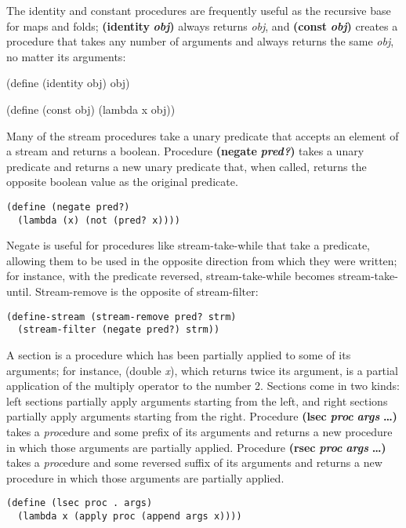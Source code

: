 The identity and constant procedures are frequently useful as the
recursive base for maps and folds; \textbf{(identity}
\textbf{\emph{obj})} always returns \emph{obj}, and \textbf{(const}
\textbf{\emph{obj})} creates a procedure that takes any number of
arguments and always returns the same \emph{obj}, no matter its
arguments:

(define (identity obj) obj)

(define (const obj) (lambda x obj))

Many of the stream procedures take a unary predicate that accepts an
element of a stream and returns a boolean. Procedure \textbf{(negate}
\textbf{\emph{pred?})} takes a unary predicate and returns a new unary
predicate that, when called, returns the opposite boolean value as the
original predicate.

\begin{verbatim}
(define (negate pred?)
  (lambda (x) (not (pred? x))))
\end{verbatim}

Negate is useful for procedures like stream-take-while that take a
predicate, allowing them to be used in the opposite direction from which
they were written; for instance, with the predicate reversed,
stream-take-while becomes stream-take-until. Stream-remove is the
opposite of stream-filter:

\begin{verbatim}
(define-stream (stream-remove pred? strm)
  (stream-filter (negate pred?) strm))
\end{verbatim}

A section is a procedure which has been partially applied to some of its
arguments; for instance, (double \emph{x}), which returns twice its
argument, is a partial application of the multiply operator to the
number 2. Sections come in two kinds: left sections partially apply
arguments starting from the left, and right sections partially apply
arguments starting from the right. Procedure \textbf{(lsec}
\textbf{\emph{proc}} \textbf{} \textbf{\emph{args}} \textbf{\ldots{})}
takes a \emph{proc}edure and some prefix of its arguments and returns a
new procedure in which those arguments are partially applied. Procedure
\textbf{(rsec} \textbf{\emph{proc}} \textbf{} \textbf{\emph{args}}
\textbf{\ldots{})} takes a \emph{proc}edure and some reversed suffix of
its arguments and returns a new procedure in which those arguments are
partially applied.

\begin{verbatim}
(define (lsec proc . args)
  (lambda x (apply proc (append args x))))
\end{verbatim}

